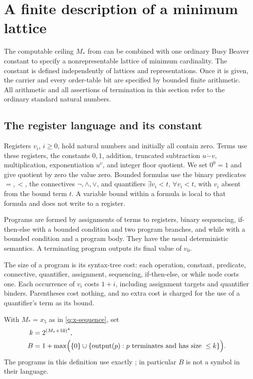\section{A finite description of a minimum lattice}\label{sec:minimum}

The computable ceiling $M_*$ from  can be combined
with one ordinary Busy Beaver constant to specify a nonrepresentable
lattice of minimum cardinality.  The constant is defined independently
of lattices and representations.  Once it is given, the carrier and
every order-table bit are specified by bounded finite arithmetic.
All arithmetic and all assertions of termination in this section refer
to the ordinary standard natural numbers.

\subsection{The register language and its constant}

\begin{definition}\label{q:register-language}
Registers $v_i$, $i\ge0$, hold natural numbers and initially all contain
zero.  Terms use these registers, the constants $0,1$, addition,
truncated subtraction $u\mathbin{\dot-}v$, multiplication, exponentiation
$u^v$, and integer floor quotient.  We set $0^0=1$ and give quotient by
zero the value zero.  Bounded formulas use the binary predicates $=,<$,
the connectives $\neg,\land,\lor$, and quantifiers
$\exists v_i<t$, $\forall v_i<t$, with $v_i$ absent from the bound term
$t$.  A variable bound within a formula is local to that formula and
does not write to a register.

Programs are formed by assignments of terms to registers, binary
sequencing, if-then-else with a bounded condition and two program
branches, and while with a bounded condition and a program body.  They
have the usual deterministic semantics.  A terminating program outputs
its final value of $v_0$.

The size of a program is its syntax-tree cost: each operation, constant,
predicate, connective, quantifier, assignment, sequencing,
if-then-else, or while node costs one.  Each occurrence of $v_i$ costs
$1+i$, including assignment targets and quantifier binders.  Parentheses
cost nothing, and no extra cost is charged for the use of a quantifier's
term as its bound.
\end{definition}

\begin{definition}\label{q:BB}
With $M_*=x_5$ as in \eqref{q:x-sequence}, set
\begin{equation}\label{q:BB-bound}
 \begin{split}
 k&=2^{(M_*+10)^4},\\
 B&=1+\max\Bigl(\{0\}\cup
       \{\operatorname{output}(p):p\text{ terminates and has size }
                                      \le k\}\Bigr).
 \end{split}
\end{equation}
The programs in this definition use exactly
; in particular $B$ is not a symbol in their
language.
\end{definition}

